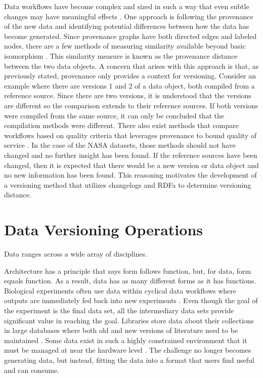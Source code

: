 Data workflows have become complex and sized in such a way that even subtle changes may have meaningful effects \cite{TILMES2011548}.
One approach is following the provenance of the new data and identifying potential differences between how the data has become generated.
Since provenance graphs have both directed edges and labeled nodes, there are a few methods of measuring similarity available beyond basic isomorphism \cite{Cao2013} \cite{Gao2010} \cite{Goddard:1996:DGU:246962.246972} .
This similarity measure is known as the provenance distance between the two data objects.
A concern that arises with this approach is that, as previously stated, provenance only provides a context for versioning.
Consider an example where there are versions 1 and 2 of a data object, both compiled from a reference source.
Since there are two versions, it is understood that the versions are different so the comparison extends to their reference sources.
If both versions were compiled from the same source, it can only be concluded that the compilation methods were different.
There also exist methods that compare workflows based on quality criteria that leverages provenance to bound quality of service \cite{2015:CAA:2778374.2778504}.
In the case of the NASA datasets, those methods should not have changed and no further insight has been found.
If the reference sources have been changed, then it is expected that there would be a new version or data object and no new information has been found.
This reasoning motivates the development of a versioning method that utilizes changelogs and RDFa to determine versioning distance.

\section{Data Versioning Operations}
Data ranges across a wide array of disciplines.

Architecture has a principle that says form follows function, but, for data, form equals function.
As a result, data has as many different forms as it has functions.
Biological experiments often use data within cyclical data workflows where outputs are immediately fed back into new experiments \cite{Tagger2005}.
Even though the goal of the experiment is the final data set, all the intermediary data sets provide significant value in reaching the goal.
Libraries store data about their collections in large databases where both old and new versions of literature need to be maintained \cite{Wiil:2000:RDH:338407.338517}.
Some data exist in such a highly constrained environment that it must be managed at near the hardware level \cite{Flouris04clotho:transparent}.
The challenge no longer becomes generating data, but instead, fitting the data into a format that users find useful and can consume.

